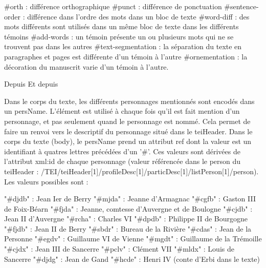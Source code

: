 \documentclass[12pt, a4paper]{article}
\begin{document}
                           #orth : différence orthographique
                           #punct : différence de ponctuation
                           #sentence-order : différence dans l'ordre des mots dans un bloc de texte
                           #word-diff : des mots différents sont utilisés dans un même bloc de texte dans les différents témoins
                           #add-words : un témoin présente un ou plusieurs mots qui ne se trouvent pas dans les autres
                           #text-segmentation : la séparation du texte en paragraphes et pages est différente d'un témoin à l'autre
                           #ornementation : la décoration du manuscrit varie d'un témoin à l'autre.
                        
                        
                           
                              Depuis
                              Et depuis
                           
                        
                     Dans le corps du texte, les différents personnages mentionnés sont encodés dans un persName. L'élément est utilisé à chaque fois qu'il est fait mention d'un personnage, 
                        et pas seulement quand le personnage est nommé. Cela permet de faire un renvoi vers le descriptif du personnage situé dans le teiHeader. Dans le corps du texte (body),
                        le persName prend un attribut ref dont la valeur est un identifiant à quatres lettres précédées d'un '#'. Ces valeurs sont dérivées de l'attribut xml:id 
                        de chaque personnage (valeur référencée dans le person du teiHeader : /TEI/teiHeader[1]/profileDesc[1]/particDesc[1]/listPerson[1]/person). Les valeurs possibles sont :
                        
                           "#djdb" : Jean Ier de Berry
                           "#mjda" : Jeanne d'Armagnac
                           "#cgfb" : Gaston III de Foix-Béarn
                           "#fjda" : Jeanne, comtesse d'Auvergne et de Boulogne
                           "#cjdb" : Jean II d'Auvergne
                           "#rcha" : Charles VI
                           "#dpdb" : Philippe II de Bourgogne
                           "#fjdb" : Jean II de Berry
                           "#sbdr" : Bureau de la Rivière
                           "#cdas" : Jean de la Personne
                           "#egdv" : Guillaume VI de Vienne
                           "#mgdt" : Guillaume de la Trémoille
                           "#cjdx" : Jean III de Sancerre
                           "#pclv" : Clément VII
                           "#mldx" : Louis de Sancerre
                           "#djdg" : Jean de Gand
                           "#hcde" : Henri IV (conte d'Erbi dans le texte)
                        
\end{document}

